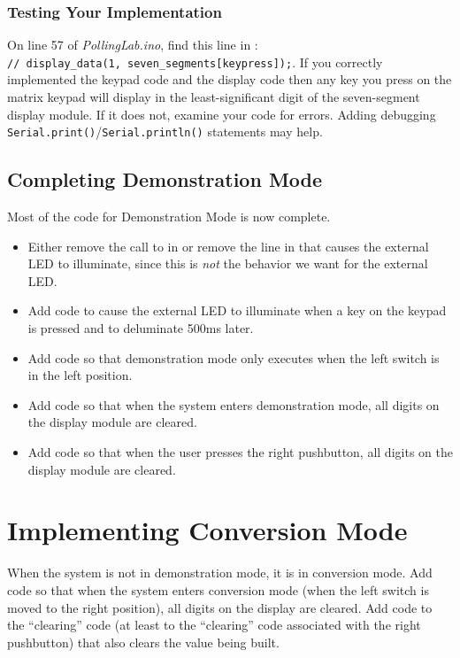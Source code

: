 \subsubsection{Testing Your Implementation}

On line 57 of \textit{PollingLab.ino}, find this line in : \\
\lstinline{// display_data(1, seven_segments[keypress]);}. If you correctly
implemented the keypad code and the display code then any key you press on the
matrix keypad will display in the least-significant digit of the seven-segment
display module. If it does not, examine your code for errors. Adding debugging
\lstinline{Serial.print()}/\lstinline{Serial.println()} statements may help.

\subsection{Completing Demonstration Mode}

Most of the code for Demonstration Mode is now complete.

    \begin{itemize}
    \item Either remove the call to  in
         or remove the line in  that
        causes the external LED to illuminate, since this is \textit{not} the
        behavior we want for the external LED.
    \item Add code to cause the external LED to illuminate when a key on the
        keypad is pressed and to deluminate 500ms later.
    \item Add code so that demonstration mode only executes when the left
        switch is in the left position.
    \item Add code so that when the system enters demonstration mode, all
        digits on the display module are cleared.
    \item Add code so that when the user presses the right pushbutton, all
        digits on the display module are cleared.
    \end{itemize}

\section{Implementing Conversion Mode} \label{sec:ConversionMode}

When the system is not in demonstration mode, it is in conversion mode. Add
code so that when the system enters conversion mode (when the left switch is
moved to the right position), all digits on the display are cleared. Add code
to the ``clearing'' code (at least to the ``clearing'' code associated with the
right pushbutton) that also clears the value being built.

